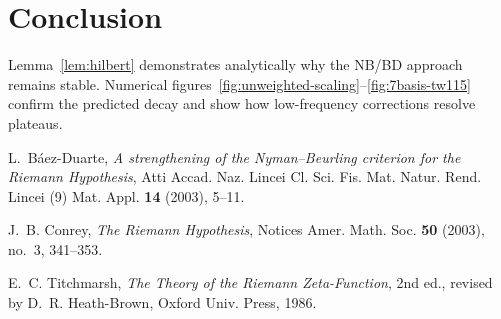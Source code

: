 \documentclass[11pt]{article}
\theoremstyle{remark}
\begin{document}
\section{Conclusion}
Lemma~\ref{lem:hilbert} demonstrates analytically why the NB/BD approach remains stable. Numerical figures~\ref{fig:unweighted-scaling}--\ref{fig:7basis-tw115} confirm the predicted decay and show how low-frequency corrections resolve plateaus.

\begin{thebibliography}{9}

L.~B\'aez-Duarte, \emph{A strengthening of the Nyman--Beurling criterion for the Riemann Hypothesis}, Atti Accad. Naz. Lincei Cl. Sci. Fis. Mat. Natur. Rend. Lincei (9) Mat. Appl. \textbf{14} (2003), 5--11.

J.~B. Conrey, \emph{The Riemann Hypothesis}, Notices Amer. Math. Soc. \textbf{50} (2003), no.~3, 341--353.

E.~C. Titchmarsh, \emph{The Theory of the Riemann Zeta-Function}, 2nd ed., revised by D.~R. Heath-Brown, Oxford Univ. Press, 1986.

\end{thebibliography}
\end{document}
